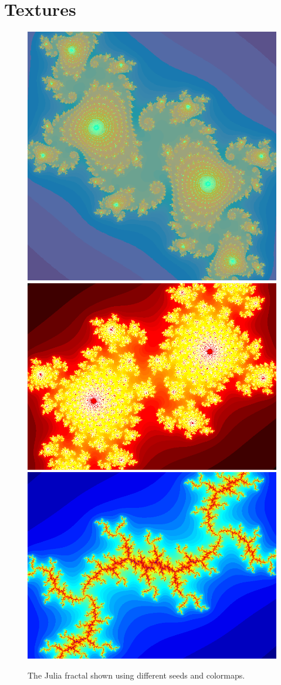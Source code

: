 \section{Textures}

\begin{figure}
\centering
\includegraphics[width=0.26\linewidth]{./img/julia}
\includegraphics[width=0.33\linewidth]{./img/julia2}
\includegraphics[width=0.33 \linewidth]{./img/julia4}
\caption{The Julia fractal shown using different seeds and colormaps.}
\label{fig:julia4}
\end{figure}
